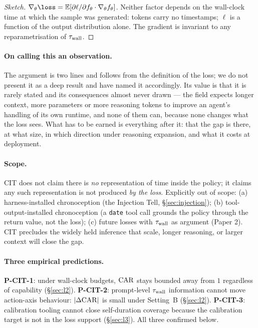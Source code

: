 \documentclass{article}
\begin{document}
\begin{proof}[Sketch] $\nabla_\theta\loss = \mathbb{E}[\partial\ell/\partial f_\theta \cdot \nabla_\theta f_\theta]$. Neither factor depends on the wall-clock time at which the sample was generated: tokens carry no timestamps; $\ell$ is a function of the output distribution alone. The gradient is invariant to any reparametrisation of $\tau_{\mathrm{wall}}$.
\end{proof}

\paragraph{On calling this an observation.} The argument is two lines and follows from the definition of the loss; we do not present it as a deep result and have named it accordingly. Its value is that it is rarely stated and its consequences almost never drawn --- the field expects longer context, more parameters or more reasoning tokens to improve an agent's handling of its own runtime, and none of them can, because none changes what the loss sees. What has to be earned is everything after it: that the gap is there, at what size, in which direction under reasoning expansion, and what it costs at deployment.

\paragraph{Scope.} CIT does not claim there is \emph{no} representation of time inside the policy; it claims any such representation is not produced \emph{by the loss}. Explicitly out of scope: (a) harness-installed chronoception (the Injection Tell, \S\ref{sec:injection}); (b) tool-output-installed chronoception (a \texttt{date} tool call grounds the policy through the return value, not the loss); (c) future losses with $\tau_{\mathrm{wall}}$ as argument (Paper 2). CIT precludes the widely held inference that scale, longer reasoning, or larger context will close the gap.

\paragraph{Three empirical predictions.} \textbf{P-CIT-1}: under wall-clock budgets, $\mathrm{CAR}$ stays bounded away from $1$ regardless of capability (\S\ref{sec:l2}). \textbf{P-CIT-2}: prompt-level $\tau_{\mathrm{wall}}$ information cannot move action-axis behaviour: $|\Delta\mathrm{CAR}|$ is small under Setting~B (\S\ref{sec:l2}). \textbf{P-CIT-3}: calibration tooling cannot close self-duration coverage because the calibration target is not in the loss support (\S\ref{sec:l3}). All three confirmed below.
\end{document}
